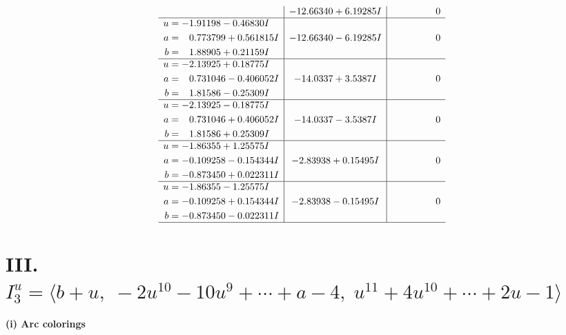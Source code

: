 \documentclass[1p]{elsarticle_modified}
\theoremstyle{definition}
\begin{document}
$$\begin{array}{c|c|c}
 & -12.66340 + 6.19285 I & \phantom{-0.000000 } 0 \\ \hline\begin{aligned}
u &= -1.91198 - 0.46830 I \\
a &= \phantom{-}0.773799 + 0.561815 I \\
b &= \phantom{-}1.88905 + 0.21159 I\end{aligned}
 & -12.66340 - 6.19285 I & \phantom{-0.000000 } 0 \\ \hline\begin{aligned}
u &= -2.13925 + 0.18775 I \\
a &= \phantom{-}0.731046 - 0.406052 I \\
b &= \phantom{-}1.81586 - 0.25309 I\end{aligned}
 & -14.0337 + 3.5387 I & \phantom{-0.000000 } 0 \\ \hline\begin{aligned}
u &= -2.13925 - 0.18775 I \\
a &= \phantom{-}0.731046 + 0.406052 I \\
b &= \phantom{-}1.81586 + 0.25309 I\end{aligned}
 & -14.0337 - 3.5387 I & \phantom{-0.000000 } 0 \\ \hline\begin{aligned}
u &= -1.86355 + 1.25575 I \\
a &= -0.109258 - 0.154344 I \\
b &= -0.873450 + 0.022311 I\end{aligned}
 & -2.83938 + 0.15495 I & \phantom{-0.000000 } 0 \\ \hline\begin{aligned}
u &= -1.86355 - 1.25575 I \\
a &= -0.109258 + 0.154344 I \\
b &= -0.873450 - 0.022311 I\end{aligned}
 & -2.83938 - 0.15495 I & \phantom{-0.000000 } 0\\
 \hline 
 \end{array}$$\newpage\newpage\renewcommand{\arraystretch}{1}
\centering \section*{III. $I^u_{3}= \langle b+u,\;-2 u^{10}-10 u^9+\cdots+a-4,\;u^{11}+4 u^{10}+\cdots+2 u-1 \rangle$}
\flushleft \textbf{(i) Arc colorings}\\
\end{document}
